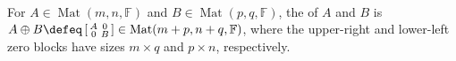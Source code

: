 \begin{definition} \label{def:matrix-direct-sum} \\
For $A\in\operatorname{Mat}(m,n,\mathbb{F})$ and $B\in\operatorname{Mat}(p,q,\mathbb{F})$, the  of $A$ and $B$ is $A\oplus B\defeq\left[\begin{smallmatrix}A&0\\0&B\end{smallmatrix}\right]\in\operatorname{Mat}(m+p,n+q,\mathbb{F})$, where the upper-right and lower-left zero blocks have sizes $m\times q$ and $p\times n$, respectively.
\end{definition}
